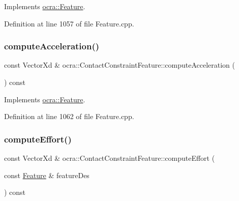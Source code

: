 Implements \hyperlink{classocra_1_1Feature_a4a5973d27459d2dececec8dc73038df8}{ocra\+::\+Feature}.



Definition at line 1057 of file Feature.\+cpp.

\hypertarget{classocra_1_1ContactConstraintFeature_a8537fa220270cf526014f0c4f5e6ea75}{}\label{classocra_1_1ContactConstraintFeature_a8537fa220270cf526014f0c4f5e6ea75} 
\subsubsection{\texorpdfstring{compute\+Acceleration()}{computeAcceleration()}\hspace{0.1cm}{\footnotesize\ttfamily [2/2]}}
{\footnotesize\ttfamily const Vector\+Xd \& ocra\+::\+Contact\+Constraint\+Feature\+::compute\+Acceleration (\begin{DoxyParamCaption}{ }\end{DoxyParamCaption}) const\hspace{0.3cm}{\ttfamily [virtual]}}



Implements \hyperlink{classocra_1_1Feature_aa42b61d4255116caa92042d01ca36b79}{ocra\+::\+Feature}.



Definition at line 1062 of file Feature.\+cpp.

\hypertarget{classocra_1_1ContactConstraintFeature_ab545e20b58d45b47a0e2f2a0a64f9c48}{}\label{classocra_1_1ContactConstraintFeature_ab545e20b58d45b47a0e2f2a0a64f9c48} 
\subsubsection{\texorpdfstring{compute\+Effort()}{computeEffort()}\hspace{0.1cm}{\footnotesize\ttfamily [1/2]}}
{\footnotesize\ttfamily const Vector\+Xd \& ocra\+::\+Contact\+Constraint\+Feature\+::compute\+Effort (\begin{DoxyParamCaption}\item[{const \hyperlink{classocra_1_1Feature}{Feature} \&}]{feature\+Des }\end{DoxyParamCaption}) const\hspace{0.3cm}{\ttfamily [virtual]}}



